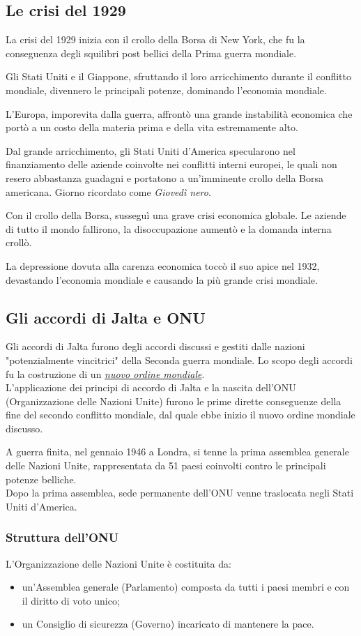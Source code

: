 \documentclass{article}
\begin{document}
\subsection{Le crisi del 1929}
La crisi del 1929 inizia con il crollo della Borsa di New York, che fu la conseguenza degli
squilibri post bellici della Prima guerra mondiale.

Gli Stati Uniti e il Giappone, sfruttando il loro arricchimento durante il conflitto mondiale,
divennero le principali potenze, dominando l'economia mondiale.

L'Europa, imporevita dalla guerra, affrontò una grande instabilità economica che portò a un
costo della materia prima e della vita estremamente alto.

Dal grande arricchimento, gli Stati Uniti d'America specularono nel finanziamento delle aziende
coinvolte nei conflitti interni europei, le quali non resero abbastanza guadagni e portatono a
un'imminente crollo della Borsa americana. Giorno ricordato come \textit{Giovedì nero}.

Con il crollo della Borsa, susseguì una grave crisi economica globale.
Le aziende di tutto il mondo fallirono, la disoccupazione aumentò e la domanda interna crollò.

La depressione dovuta alla carenza economica toccò il suo apice nel 1932, devastando l'economia
mondiale e causando la più grande crisi mondiale.

\subsection{Gli accordi di Jalta e ONU}
Gli accordi di Jalta furono degli accordi discussi e gestiti dalle nazioni "potenzialmente
vincitrici" della Seconda guerra mondiale. Lo scopo degli accordi fu la costruzione di un
\underline{\textit{nuovo ordine mondiale}}.\\
L'applicazione dei principi di accordo di Jalta e la nascita dell'ONU (Organizzazione delle
Nazioni Unite) furono le prime dirette conseguenze della fine del secondo conflitto mondiale,
dal quale ebbe inizio il nuovo ordine mondiale discusso.

A guerra finita, nel gennaio 1946 a Londra, si tenne la prima assemblea generale delle Nazioni
Unite, rappresentata da 51 paesi coinvolti contro le principali potenze belliche.\\
Dopo la prima assemblea, sede permanente dell'ONU venne traslocata negli Stati Uniti d'America.

\subsubsection{Struttura dell'ONU}
L'Organizzazione delle Nazioni Unite è costituita da:
\begin{itemize}
    \item un'Assemblea generale (Parlamento) composta da tutti i paesi membri e con
        il diritto di voto unico;
    \item un Consiglio di sicurezza (Governo) incaricato di mantenere la pace.
\end{itemize}
\end{document}

